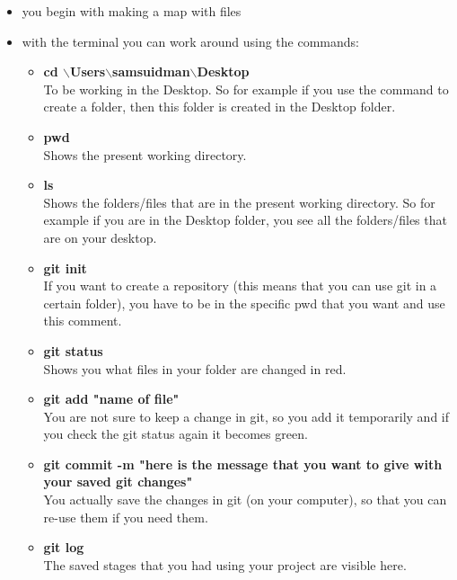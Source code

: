 \documentclass{article}
\begin{document}
\begin{itemize}
    \item you begin with making a map with files
    \item with the terminal you can work around using the commands: \\
    \begin{itemize}    
        \item \textbf{cd  $\backslash$Users$\backslash$samsuidman$\backslash$Desktop} \\
        To be working in the Desktop. So for example if you use the command to create a folder, then this folder is created in the Desktop folder. \\
        \item \textbf{pwd} \\
        Shows the present working directory. \\
        \item \textbf{ls} \\
        Shows the folders/files that are in the present working directory. So for example if you are in the Desktop folder, you see all the folders/files that are on your desktop. \\
        \item \textbf{git init} \\
        If you want to create a repository (this means that you can use git in a certain folder), you have to be in the specific pwd that you want and use this comment. \\
        \item \textbf{git status} \\
        Shows you what files in your folder are changed in red. \\
        \item \textbf{git add "name of file"} \\
        You are not sure to keep a change in git, so you add it temporarily and if you check the git status again it becomes green. \\
        \item \textbf{git commit -m "here is the message that you want to give with your saved git changes"} \\
        You actually save the changes in git (on your computer), so that you can re-use them if you need them.
        
        \item \textbf{git log} \\
        The saved stages that you had using your project are visible here. \\
        

\end{itemize}
\end{itemize}
\end{document}
